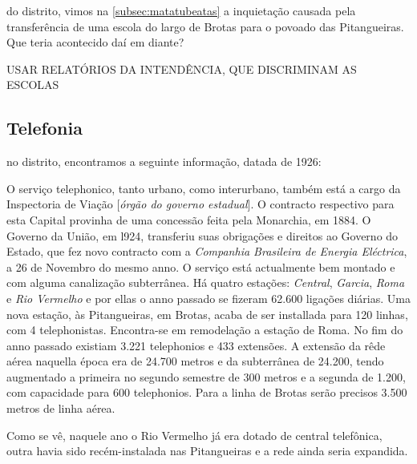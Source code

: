 do distrito, vimos na \autoref{subsec:matatubeatas} a inquietação causada pela transferência de uma escola do largo de Brotas para o povoado das Pitangueiras. Que teria acontecido daí em diante?



USAR RELATÓRIOS DA INTENDÊNCIA, QUE DISCRIMINAM AS ESCOLAS

\subsection{Telefonia} 

no distrito, encontramos a seguinte informação, datada de 1926:

\begin{citacao}
O serviço telephonico, tanto urbano, como interurbano, também está a cargo da Inspectoria de Viação [\textit{órgão do governo estadual}].
O contracto respectivo para esta Capital provinha de uma concessão feita pela Monarchia, em 1884.
O Governo da União, em l924, transferiu suas obrigações e direitos ao Governo do Estado, que fez novo contracto com a \textit{Companhia Brasileira de Energia Eléctrica}, a 26 de Novembro do mesmo anno.
O serviço está actualmente bem montado e com alguma canalização subterrânea.
Há quatro estações: \textit{Central}, \textit{Garcia}, \textit{Roma} e \textit{Rio Vermelho} e por ellas o anno passado se fizeram 62.600 ligações diárias.
Uma nova estação, às Pitangueiras, em Brotas, acaba de ser installada para 120 linhas, com 4 telephonistas.
Encontra-se em remodelação a estação de Roma.
No fim do anno passado existiam 3.221 telephonios e 433 extensões.
A extensão da rêde aérea naquella época era de 24.700 metros e da subterrânea de 24.200, tendo augmentado a primeira no segundo semestre de 300 metros e a segunda
de 1.200, com capacidade para 600 telephonios.
Para a linha de Brotas serão precisos 3.500 metros de linha aérea. \cite[pp.~266-267]{bahia_rpe_1926}
\end{citacao}

Como se vê, naquele ano o Rio Vermelho já era dotado de central telefônica, outra havia sido recém-instalada nas Pitangueiras e a rede ainda seria expandida.